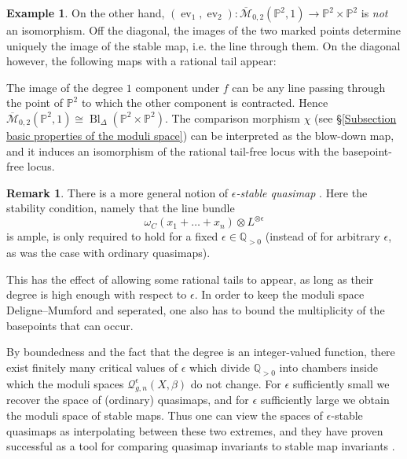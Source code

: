 \documentclass[11pt]{amsart}
\newcommand{\M}[4]{\overline{\mathcal{M}}_{#1,#2}(#3,#4)}
\newcommand{\Q}[4]{\mathcal{Q}_{#1,#2}(#3,#4)}
\newcommand{\Qe}[4]{\mathcal{Q}^{\epsilon}_{#1,#2}(#3,#4)}
\newcommand{\PP}{\mathbb P}
\renewcommand{\to}{\rightarrow}
\newcommand{\comp}{\chi}
\newcommand{\QQ}{\mathbb{Q}}
\newcommand{\ev}{\operatorname{ev}}
\theoremstyle{definition}
\theoremstyle{definition}
\newtheorem{example}[thm]{Example}
\newtheorem{remark}[thm]{Remark}
\newcommand{\ilemph}[1]{\emph{#1}}
\begin{document}
\begin{example}
On the other hand, $(\ev_1,\ev_2)\colon\M{0}{2}{\PP^2}{1}\to\PP^2\times\PP^2$ is \emph{not} an isomorphism. Off the diagonal, the images of the two marked points determine uniquely the image of the stable map, i.e. the line through them. On the diagonal however, the following maps with a rational tail appear:
\begin{center}
\end{center}
The image of the degree $1$ component under $f$ can be any line passing through the point of $\PP^2$ to which the other component is contracted. Hence $\M{0}{2}{\PP^2}{1}\cong\operatorname{Bl}_{\Delta}(\PP^2\times\PP^2)$. The comparison morphism $\comp$ (see \S \ref{Subsection basic properties of the moduli space}) can be interpreted as the blow-down map, and it induces an isomorphism of the rational tail-free locus with the basepoint-free locus.
\end{example}


\begin{remark}
 There is a more general notion of \ilemph{$\epsilon$-stable quasimap} \cite[\S 7.1]{CFKM}. Here the stability condition, namely that the line bundle
\begin{equation*} \omega_C(x_1 + \ldots + x_n)\otimes L^{\otimes \epsilon} \end{equation*} 
is ample, is only required to hold for a fixed $\epsilon \in \QQ_{>0}$ (instead of for arbitrary $\epsilon$, as was the case with ordinary quasimaps).

This has the effect of allowing some rational tails to appear, as long as their degree is high enough with respect to $\epsilon$. In order to keep the moduli space Deligne--Mumford and seperated, one also has to bound the multiplicity of the basepoints that can occur.

By boundedness and the fact that the degree is an integer-valued function, there exist finitely many critical values of $\epsilon$ which divide $\QQ_{>0}$ into chambers inside which the moduli spaces $\Qe{g}{n}{X}{\beta}$ do not change.
For $\epsilon$ sufficiently small we recover the space of (ordinary) quasimaps, and for $\epsilon$ sufficiently large we obtain the moduli space of stable maps. Thus one can view the spaces of $\epsilon$-stable quasimaps as interpolating between these two extremes, and they have proven  successful as a tool for comparing quasimap invariants to stable map invariants \cite{TodaStableQuotient} \cite{CF-K-wallcrossing}.
\end{remark}
\end{document}
